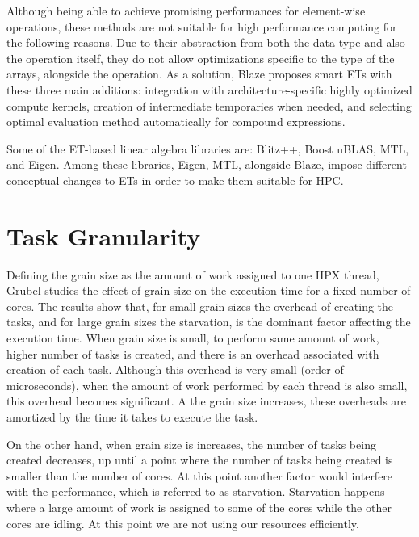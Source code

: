 Although being able to achieve promising performances for element-wise operations, these methods are not suitable for high performance computing for the following reasons. Due to their abstraction from both the data type and also the operation itself, they do not allow optimizations specific to the type of the arrays, alongside the operation\cite{iglberger2012expression}. As a solution, Blaze proposes smart ETs with these three main additions: integration with architecture-specific highly optimized compute kernels, creation of intermediate temporaries when needed, and selecting optimal evaluation method automatically for compound expressions\cite{iglberger2012expression}. 

Some of the ET-based linear algebra libraries are: Blitz++\cite{Blitz}, Boost uBLAS\cite{ublas}, MTL\cite{MTL}, and Eigen\cite{guennebaud2010eigen}. Among these libraries, Eigen, MTL, alongside Blaze, impose different conceptual changes to ETs in order to make them suitable for HPC.    
 
\vspace{\baselineskip}
\section{Task Granularity}
Defining the grain size as the amount of work assigned to one HPX thread, Grubel\cite{grubel2015performance} studies the effect of grain size on the execution time for a fixed number of cores. The results show that, for small grain sizes the overhead of creating the tasks, and for large grain sizes the starvation, is the dominant factor affecting the execution time\cite{grubel2015performance}. When grain size is small, to perform same amount of work, higher number of tasks is created, and there is an overhead associated with creation of each task. Although this overhead is very small (order of microseconds), when the amount of work performed by each thread is also small, this overhead becomes significant. A the grain size increases, these overheads are amortized by the time it takes to execute the task. 

On the other hand, when grain size is increases, the number of tasks being created decreases, up until a point where the number of tasks being created is smaller than the number of cores. At this point another factor would interfere with the performance, which is referred to as starvation. Starvation happens where a large amount of work is assigned to some of the cores while the other cores are idling. At this point we are not using our resources efficiently. 

